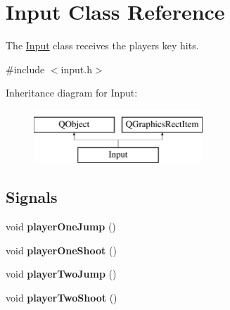 \hypertarget{class_input}{}\section{Input Class Reference}
\label{class_input}


The \hyperlink{class_input}{Input} class receives the players\textquotesingle{} key hits.  




{\ttfamily \#include $<$input.\+h$>$}

Inheritance diagram for Input\+:\begin{figure}[H]
\begin{center}
\leavevmode
\includegraphics[height=2.000000cm]{class_input}
\end{center}
\end{figure}
\subsection*{Signals}
\begin{DoxyCompactItemize}
\item 
void {\bfseries player\+One\+Jump} ()\hypertarget{class_input_a3c56e6c2e6960014a56835cab6298d20}{}\label{class_input_a3c56e6c2e6960014a56835cab6298d20}

\item 
void {\bfseries player\+One\+Shoot} ()\hypertarget{class_input_a90a64a89b4d9804ed16c6141e9946a58}{}\label{class_input_a90a64a89b4d9804ed16c6141e9946a58}

\item 
void {\bfseries player\+Two\+Jump} ()\hypertarget{class_input_ad7689c70cb0680ed838db073af088c0a}{}\label{class_input_ad7689c70cb0680ed838db073af088c0a}

\item 
void {\bfseries player\+Two\+Shoot} ()\hypertarget{class_input_af8eba659f268b7cb19558c5a2bd40d17}{}\label{class_input_af8eba659f268b7cb19558c5a2bd40d17}

\end{DoxyCompactItemize}
